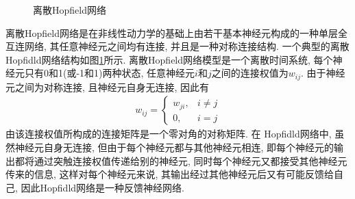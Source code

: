 \begin{figure}[H]
\begin{center}
\caption{离散Hopfield网络}
\label{AI32fig201912022608}
\end{center}
\end{figure}
离散Hopfield网络是在非线性动力学的基础上由若干基本神经元构成的一种单层全互连网络, 其任意神经元之间均有连接, 并且是一种对称连接结构. 一个典型的离散 Hopfidld网络结构如图\ref{AI32fig201912022608}所示. 离散Hopfield网络模型是一个离散时间系统, 每个神经元只有0和1(或-1和1)两种状态, 任意神经元$i$和$j$之间的连接权值为$w_{ij}$. 由于神经元之间为对称连接, 且神经元自身无连接, 因此有
\begin{align}
  w_{i j}=\left\{
  \begin{array}{ll}
  {w_{j i}}, & i \neq j \\
    {0}, &  i=j
    \end{array}\right.
\end{align}
由该连接权值所构成的连接矩阵是一个零对角的对称矩阵. 在 Hopfidld网络中, 虽然神经元自身无连接, 但由于每个神经元都与其他神经元相连, 即每个神经元的输出都将通过突触连接权值传递给别的神经元, 同时每个神经元又都接受其他神经元传来的信息, 这样对每个神经元来说, 其输出经过其他神经元后又有可能反馈给自己, 因此Hopfidld网络是一种反馈神经网络.
